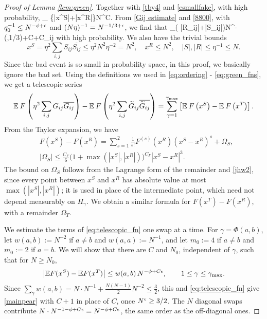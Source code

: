 \begin{proof}[Proof of Lemma \ref{lem:green}]
Together with \eqref{tby4} and \eqref{esmallfake}, with high probability,
\be\label{flld}
\quad \max_{\gamma} \{|x^S|+|x^R|\}\leq N^{C\e}.
\ee
From \eqref{Gij estimate} and \eqref{8800}, with $q_0^{-1}\le N^{-\phi+\epsilon}$ and $(N\eta)^{-1}=N^{-1/3+\epsilon}$, we find that
\be
\max_{\gamma}\left( |R_{ij}|+|S_{ij}|\right)\leq N^{-\min(\phi,1/3)+C\e}+C\delta_{ij}
\ee
with high probability. We also have the trivial bounds
\begin{equation}
x^S = \eta^2 \sum_{i, j} S_{ij} \overline{S_{ij}} \leq \eta^2 N^2 \eta^{-2} = N^2, \quad x^R \leq N^2, \quad 
|S|, |R|\leq \eta^{-1}\le N.
\end{equation}
Since the bad event is so small in probability space, in this proof, we basically ignore the bad set. Using the definitions we used in \eqref{eq:ordering} - \eqref{eq:green_fns}, we get a telescopic series
\begin{equation} \label{eq:telescopic_fn}
\mathbb{E} \: F \left( \eta^2 \sum_{i, j} G _{ij} \overline{G_{ij}}  \right) - \mathbb{E} \: F \left( \eta^2 \sum_{i, j} \widetilde G _{ij} \overline{\widetilde G_{ij}} \right) 
= \sum_{\gamma=1}^{\gamma_{\max}} \left[ \mathbb{E} \: F \left( x^{S} \right) - \mathbb{E} \: F \left( x^{T} \right) \right].
\end{equation}
From the Taylor expansion, we have
\begin{equation} \begin{split} \label{eq:taylor}
&F(x^S) - F(x^R) = \sum_{s=1}^2 \frac{1}{s!} F^{(s)}(x^R) (x^S - x^R)^s  + \Omega_S, \\
&|\Omega_S|\le\frac{C_F}{6}\big(1+\max(|x^S|,|x^R|)\big)^{C_F}|x^S - x^R|^3.
\end{split}\end{equation}
The bound on $\Omega_S$ follows from the Lagrange form of the remainder and \eqref{jhw2}, since every point between $x^S$ and $x^R$ has absolute value at most $\max(|x^S|,|x^R|)$; it is used in place of the intermediate point, which need not depend measurably on $H_\gamma$. We obtain a similar formula for $F(x^T) - F(x^R)$, with a remainder $\Omega_T$.

We estimate the terms of \eqref{eq:telescopic_fn} one swap at a time. For $\gamma=\Phi(a,b)$, let $w(a,b):=N^{-2}$ if $a\ne b$ and $w(a,a):=N^{-1}$, and let $m_0:=4$ if $a\ne b$ and $m_0:=2$ if $a=b$. We will show that there are $C$ and $N_0$, independent of $\gamma$, such that for $N\ge N_0$,
$$
\big|\mathbb{E} F(x^S)-\mathbb{E} F(x^T)\big|\le w(a,b)\,N^{-\phi+C\epsilon}, \qquad 1\le\gamma\le\gamma_{\max}.
$$
Since $\sum_{\gamma}w(a,b)=N\cdot N^{-1}+\frac{N(N-1)}{2}N^{-2}\le\frac32$, this and \eqref{eq:telescopic_fn} give \eqref{mainpear} with $C+1$ in place of $C$, once $N^{\epsilon}\ge3/2$. The $N$ diagonal swaps contribute $N\cdot N^{-1-\phi+C\epsilon}=N^{-\phi+C\epsilon}$, the same order as the off-diagonal ones.


\end{proof}
